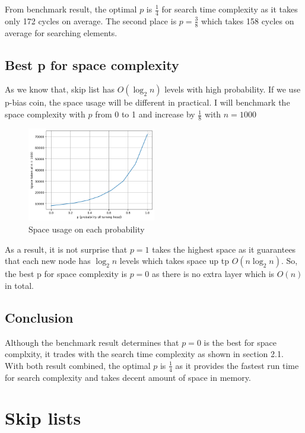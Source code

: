 \documentclass[a4paper, 12pt]{report}
\begin{document}
From benchmark result, the optimal $p$ is $\frac{1}{4}$ for search time complexity as it takes only 172 cycles on average.
The second place is $p = \frac{3}{8}$ which takes 158 cycles on average for searching elements.

\section{Best p for space complexity}

As we know that, skip list has $O(\log_2 n)$ levels with high probability. If we use p-bias coin, the space usage will be different
in practical. I will benchmark the space complexity with $p$ from 0 to 1 and increase by $\frac{1}{8}$ with $n = 1000$

\newpage
\begin{figure}[h]
        \centering
        \includegraphics[width=0.5\textwidth,scale=0.2]{best_p_for_space.png}
        \caption{\label{fig:best-p-for-space} Space usage on each probability}
\end{figure}

As a result, it is not surprise that $p = 1$ takes the highest space as it guarantees that each new node has $\log_2 n$ levels which takes space up tp $O(n\log_2 n)$.
So, the best p for space complexity is $p = 0$ as there is no extra layer which is $O(n)$ in total.

\section{Conclusion}
Although the benchmark result determines that $p = 0$ is the best for space complxity, it trades with the search time complexity as shown in section 2.1.
With both result combined, the optimal $p$ is $\frac{1}{4}$ as it provides the fastest run time for search complexity and takes decent amount of space in memory.

\chapter{Skip lists}
\end{document}
